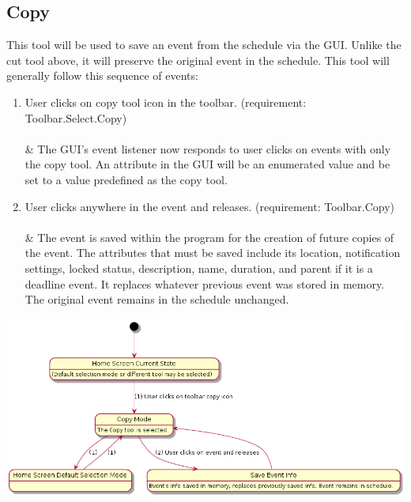 \documentclass{scrreprt}
\begin{document}
\subsection{Copy}
This tool will be used to save an event from the schedule via the GUI. Unlike the cut tool above, it will preserve the original event in the schedule. This tool will generally follow this sequence of events:
\begin{enumerate}
    \item User clicks on copy tool icon in the toolbar. (requirement: Toolbar.Select.Copy)\\
    \\ & The GUI's event listener now responds to user clicks on events with only the copy tool. An attribute in the GUI will be an enumerated value and be set to a value predefined as the copy tool.
    \item User clicks anywhere in the event and releases. (requirement: Toolbar.Copy)\\
    \\ & The event is saved within the program for the creation of future copies of the event. The attributes that must be saved include its location, notification settings, locked status, description, name, duration, and parent if it is a deadline event. It replaces whatever previous event was stored in memory. The original event remains in the schedule unchanged.
\end{enumerate}
\includegraphics[width=\textwidth]{copy.png}
\end{document}

